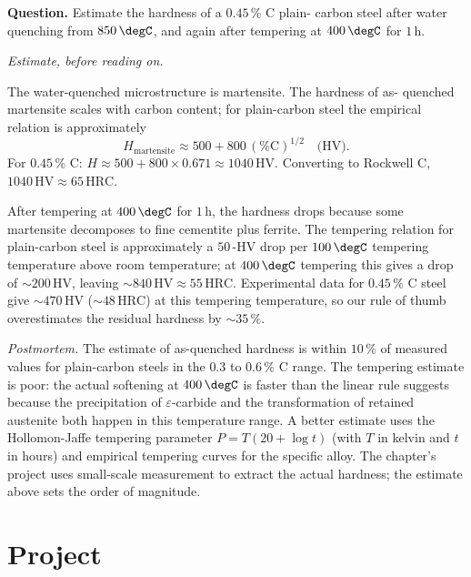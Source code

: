 \begin{estimation}
\textbf{Question.} Estimate the hardness of a $0.45\,\%$ C plain-
carbon steel after water quenching from $850\,\degC$, and again
after tempering at $400\,\degC$ for $1\,\text{h}$.

\smallskip
\textit{Estimate, before reading on.}

\smallskip
The water-quenched microstructure is martensite. The hardness of as-
quenched martensite scales with carbon content; for plain-carbon
steel the empirical relation is approximately
\[
H_{\text{martensite}} \approx 500 + 800\,(\%\text{C})^{1/2}
\quad \text{(HV)}.
\]
For $0.45\,\%$ C: $H \approx 500 + 800 \times 0.671 \approx 1040\,
\text{HV}$. Converting to Rockwell C, $1040\,\text{HV} \approx 65\,
\text{HRC}$.

After tempering at $400\,\degC$ for $1\,\text{h}$, the hardness drops
because some martensite decomposes to fine cementite plus ferrite.
The tempering relation for plain-carbon steel is approximately a
$50\,$-$\text{HV}$ drop per $100\,\degC$ tempering temperature above
room temperature; at $400\,\degC$ tempering this gives a drop of
$\sim 200\,\text{HV}$, leaving $\sim 840\,\text{HV} \approx 55\,
\text{HRC}$. Experimental data for $0.45\,\%$ C steel give $\sim 470\,
\text{HV}$ ($\sim 48\,\text{HRC}$) at this tempering temperature, so
our rule of thumb overestimates the residual hardness by $\sim 35\,\%$.

\smallskip
\textit{Postmortem.} The estimate of as-quenched hardness is within
$10\,\%$ of measured values for plain-carbon steels in the $0.3$ to
$0.6\,\%$ C range. The tempering estimate is poor: the actual
softening at $400\,\degC$ is faster than the linear rule suggests
because the precipitation of $\varepsilon$-carbide and the
transformation of retained austenite both happen in this temperature
range. A better estimate uses the Hollomon-Jaffe tempering parameter
$P = T(20 + \log t)$ (with $T$ in kelvin and $t$ in hours) and
empirical tempering curves for the specific alloy. The chapter's
project uses small-scale measurement to extract the actual hardness;
the estimate above sets the order of magnitude.
\end{estimation}

\section{Project}


